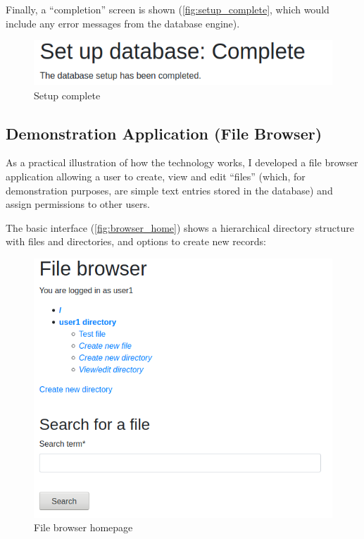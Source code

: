\documentclass[12pt]{report}
\begin{document}
Finally, a ``completion'' screen is shown (\autoref{fig:setup_complete}, which would include any error messages from the database engine).

\begin{figure}[ht]
  \begin{center}
    \includegraphics[scale=0.5]{04-setup3.png}
  \end{center}
  \caption{Setup complete}
  \label{fig:setup_complete}
\end{figure}

\subsection{Demonstration Application (File Browser)}
As a practical illustration of how the technology works, I developed a file browser application allowing a user to create, view and edit ``files'' (which, for demonstration purposes, are simple text entries stored in the database) and assign permissions to other users.

The basic interface (\autoref{fig:browser_home}) shows a hierarchical directory structure with files and directories, and options to create new records:

\begin{figure}[ht]
  \begin{center}
    \includegraphics[scale=0.5]{05-browser1.png}
  \end{center}
  \caption{File browser homepage}
  \label{fig:browser_home}
\end{figure}
\end{document}
